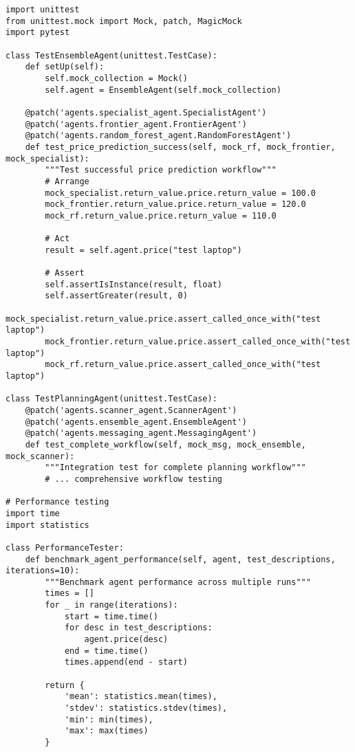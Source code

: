 \begin{lstlisting}[caption=Comprehensive Testing Framework]
import unittest
from unittest.mock import Mock, patch, MagicMock
import pytest

class TestEnsembleAgent(unittest.TestCase):
    def setUp(self):
        self.mock_collection = Mock()
        self.agent = EnsembleAgent(self.mock_collection)
    
    @patch('agents.specialist_agent.SpecialistAgent')
    @patch('agents.frontier_agent.FrontierAgent')
    @patch('agents.random_forest_agent.RandomForestAgent')
    def test_price_prediction_success(self, mock_rf, mock_frontier, mock_specialist):
        """Test successful price prediction workflow"""
        # Arrange
        mock_specialist.return_value.price.return_value = 100.0
        mock_frontier.return_value.price.return_value = 120.0
        mock_rf.return_value.price.return_value = 110.0
        
        # Act
        result = self.agent.price("test laptop")
        
        # Assert
        self.assertIsInstance(result, float)
        self.assertGreater(result, 0)
        mock_specialist.return_value.price.assert_called_once_with("test laptop")
        mock_frontier.return_value.price.assert_called_once_with("test laptop")
        mock_rf.return_value.price.assert_called_once_with("test laptop")

class TestPlanningAgent(unittest.TestCase):
    @patch('agents.scanner_agent.ScannerAgent')
    @patch('agents.ensemble_agent.EnsembleAgent')
    @patch('agents.messaging_agent.MessagingAgent')
    def test_complete_workflow(self, mock_msg, mock_ensemble, mock_scanner):
        """Integration test for complete planning workflow"""
        # ... comprehensive workflow testing

# Performance testing
import time
import statistics

class PerformanceTester:
    def benchmark_agent_performance(self, agent, test_descriptions, iterations=10):
        """Benchmark agent performance across multiple runs"""
        times = []
        for _ in range(iterations):
            start = time.time()
            for desc in test_descriptions:
                agent.price(desc)
            end = time.time()
            times.append(end - start)
        
        return {
            'mean': statistics.mean(times),
            'stdev': statistics.stdev(times),
            'min': min(times),
            'max': max(times)
        }
\end{lstlisting}

